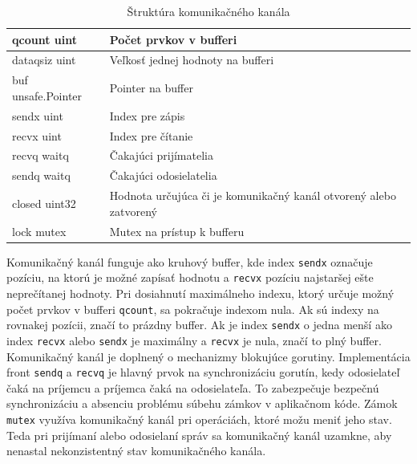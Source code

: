 \documentclass[
  biblatex,
  seconds=true,
  language=slovak,
  figures=false,
  urldate=iso,
  glossaries,
  index
]{kidiplom}
\begin{document}
\begin{table}[H]
	\caption{Štruktúra komunikačného kanála \cite{goChan}}
	\begin{tabular}{|l|p{8cm}|}
		\hline
		qcount uint        & Počet prvkov v bufferi                                            \\
		\hline
		dataqsiz uint      & Veľkosť jednej hodnoty na bufferi                                 \\
		\hline
		buf unsafe.Pointer & Pointer na buffer                                                 \\
		\hline
		sendx uint         & Index pre zápis                                                   \\
		\hline
		recvx uint         & Index pre čítanie                                                 \\
		\hline
		recvq waitq        & Čakajúci prijímatelia                                             \\
		\hline
		sendq waitq        & Čakajúci odosielatelia                                            \\
		\hline
		closed uint32      & Hodnota určujúca či je komunikačný kanál otvorený alebo zatvorený \\
		\hline
		lock mutex         & Mutex na prístup k bufferu                                        \\
		\hline
	\end{tabular}
\end{table}
Komunikačný kanál funguje ako kruhový buffer, kde index \texttt{sendx} označuje pozíciu, na ktorú je možné zapísať hodnotu a \texttt{recvx} pozíciu najstaršej ešte neprečítanej hodnoty.
Pri dosiahnutí maximálneho indexu, ktorý určuje možný počet prvkov v bufferi \texttt{qcount},
sa pokračuje indexom nula. Ak sú indexy na rovnakej pozícii,
značí to prázdny buffer. Ak je index \texttt{sendx} o jedna menší ako index \texttt{recvx} alebo \texttt{sendx} je maximálny a \texttt{recvx} je nula, značí to plný buffer.
Komunikačný kanál je doplnený o mechanizmy blokujúce gorutiny.\cite{goChan}
Implementácia front \texttt{sendq} a \texttt{recvq} je hlavný prvok na synchronizáciu gorutín, kedy odosielateľ čaká na príjemcu
a príjemca čaká na odosielateľa. To zabezpečuje bezpečnú synchronizáciu a absenciu problému súbehu zámkov v aplikačnom kóde.
Zámok \texttt{mutex} využíva komunikačný kanál pri operáciách, ktoré možu meniť jeho stav. Teda pri prijímaní alebo odosielaní správ
sa komunikačný kanál uzamkne, aby nenastal nekonzistentný stav komunikačného kanála.
\end{document}
